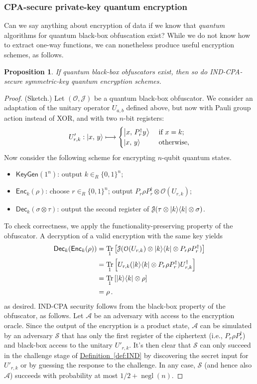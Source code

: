 \documentclass[11pt]{article}
\DeclareMathOperator{\tr}{Tr}
\numberwithin{equation}{section}
\newtheorem{prop}{Proposition}
\newcommand{\opn}{\operatorname}
\newcommand{\expref}[2]{\texorpdfstring{\hyperref[#2]{#1~\ref{#2}}}{#1~\ref{#2}}}
\newcommand{\algo}{\mathcal}
\newcommand{\negl}{\opn{negl}}
\newcommand{\KeyGen}{\ensuremath{\mathsf{KeyGen}}\xspace}
\newcommand{\Enc}{\ensuremath{\mathsf{Enc}}\xspace}
\newcommand{\Dec}{\ensuremath{\mathsf{Dec}}\xspace}
\newcommand{\inrand}{\in_R}
\begin{document}
{\subsubsection{CPA-secure private-key quantum encryption}

Can we say anything about encryption of data if we know that \emph{quantum} algorithms for quantum black-box obfuscation exist? While we do not know how to extract one-way functions, we can nonetheless produce useful encryption schemes, as follows.

\begin{prop}\label{prop:PKE-from-SKE}
If quantum black-box obfuscators exist, then so do IND-CPA-secure symmetric-key quantum encryption schemes.
\end{prop}
\begin{proof} (Sketch.)
Let $(\algo O, \algo J)$ be a quantum black-box obfuscator. We consider an adaptation of the unitary operator $U_{a, b}$ defined above, but now with Pauli group action instead of XOR, and with two $n$-bit registers:
$$
U'_{r, k} : {\left\vert{x,\, y}\right\rangle} \longmapsto
\begin{cases}
{\left\vert{x,\, P_r^\dagger y}\right\rangle} &\text{ if } x = k;\\
{\left\vert{x,\, y}\right\rangle} &\text{ otherwise},
\end{cases}
$$
Now consider the following scheme for encrypting $n$-qubit quantum states.
\begin{itemize}
\item $\KeyGen(1^n)$: output $k \inrand \{0, 1\}^n$;
\item $\Enc_{k}(\rho)$: choose $r \inrand \{0, 1\}^n$; output $P_r \rho P_r^\dagger \otimes \algo O(U_{r, k})$;
\item $\Dec_{k}(\sigma \otimes \tau)$: output  the second register of $\algo J(\tau \otimes \ket{k}\bra{k} \otimes \sigma)$.
\end{itemize}
To check correctness, we apply the functionality-preserving property of the obfuscator. A decryption of a valid encryption with the same key yields
\begin{align*}
\Dec_k (\Enc_k (\rho))  
&= \tr_1 \left[\algo J(\algo O(U_{r, k}) \otimes \ket{k}\bra{k} \otimes P_r \rho P_r^\dagger)\right] \\
&= \tr_1 \left[U_{r, k} (\ket{k}\bra{k} \otimes P_r \rho P_r^\dagger) U_{r, k}^\dagger\right] \\
&= \tr_1 \left[\ket{k}\bra{k} \otimes \rho \right] \\
& = \rho\,.
\end{align*}
as desired. IND-CPA security follows from the black-box property of the obfuscator, as follows. Let $\algo A$ be an adversary with access to the encryption oracle. Since the output of the encryption is a product state, $\algo A$ can be simulated by an adversary $\algo S$ that has only the first register of the ciphertext (i.e., $P_r \rho P_r^\dagger$) and black-box access to the unitary $U'_{r, k}$. It's then clear that $\algo S$ can only succeed in the challenge stage of \expref{Definition}{def:IND} by discovering the secret input for $U'_{r, k}$ or by guessing the response to the challenge. In any case, $\algo S$ (and hence also $\algo A$) succeeds with probability at most $1/2 + \negl(n)$.
\end{proof}

}
\end{document}
